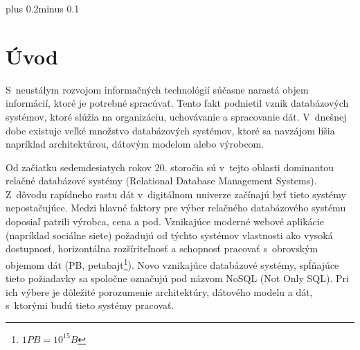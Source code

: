 \documentclass[11pt,twoside,a4paper]{book}
\begin{document}

\tableofcontents



\listoffigures



\listoftables



\mainbodystarts
\normalfont
{}\baselineskip plus 0.2\baselineskip minus 0.1\baselineskip



% 
% 

\chapter{Úvod}
S~neustálym rozvojom informačných technológií súčasne narastá objem informácií, ktoré je potrebné spracúvať. Tento fakt podnietil vznik databázových systémov, ktoré slúžia na organizáciu, uchovávanie a spracovanie dát. V~dnešnej dobe existuje veľké množstvo databázových systémov, ktoré sa navzájom líšia napríklad architektúrou, dátovým modelom alebo výrobcom.

Od začiatku sedemdesiatych rokov 20. storočia sú v~tejto oblasti dominantou relačné databázové systémy (Relational Database Management Systems). Z~dôvodu rapídneho rastu dát v~digitálnom univerze \cite{Gantz_Mcarthur_Minton_2007} začínajú byť tieto systémy nepostačujúce. Medzi hlavné faktory pre výber relačného databázového systému doposiaľ patrili výrobca, cena a pod. Vznikajúce moderné webové aplikácie (napríklad sociálne siete) požadujú od týchto systémov vlastnosti ako vysoká dostupnosť, horizontálna rozšíriteľnosť a schopnosť pracovať s~obrovským objemom dát (PB, petabajt\footnote{$ 1PB = 10^{15} B$}). Novo vznikajúce databázové systémy, spĺňajúce tieto požiadavky sa spoločne označujú pod názvom NoSQL (Not Only SQL). Pri ich výbere je dôležité porozumenie architektúry, dátového modelu a dát, s~ktorými budú tieto systémy pracovať.
\end{document}
